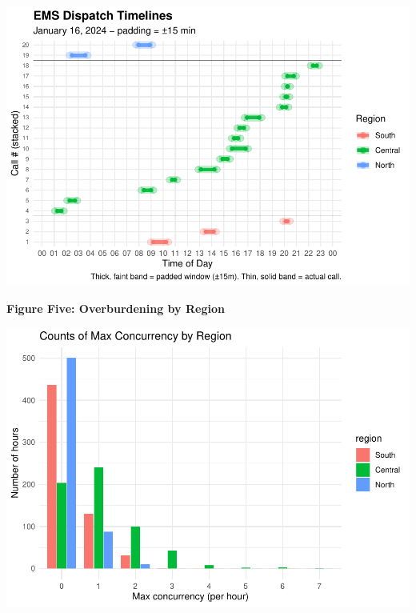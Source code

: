 \documentclass[
  11pt,
]{article}
\begin{document}
\includegraphics{Report_files/figure-latex/eda4-1.pdf}

\textbf{Figure Five: Overburdening by Region}

\includegraphics{Report_files/figure-latex/eda5-1.pdf}
\end{document}
